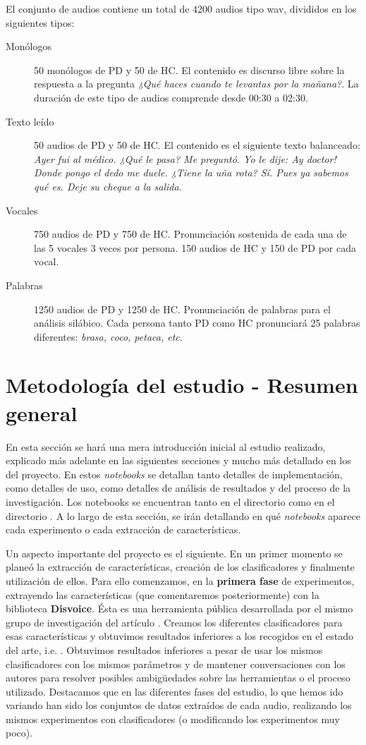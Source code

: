 El conjunto de audios contiene un total de 4200 audios tipo wav, divididos en los siguientes tipos:
\begin{description}
	\item[Monólogos] 50 monólogos de PD y 50 de HC. El contenido es discurso libre sobre la respuesta a la pregunta \textit{¿Qué haces cuando te levantas por la mañana?}. La duración de este tipo de audios comprende desde 00:30 a 02:30.
	\item[Texto leído] 50 audios de PD y 50 de HC. El contenido es el siguiente texto balanceado: \textit{Ayer fui al médico. ¿Qué le pasa? Me preguntó. Yo le dije: Ay doctor! Donde pongo el dedo me duele. ¿Tiene la uña rota? Sí. Pues ya sabemos qué es. Deje su cheque a la salida.}
	\item[Vocales] 750 audios de PD y 750 de HC. Pronunciación sostenida de cada una de las 5 vocales 3 veces por persona. 150 audios de HC y 150 de PD por cada vocal.
	\item[Palabras] 1250 audios de PD y 1250 de HC. Pronunciación de palabras para el análisis silábico. Cada persona tanto PD como HC pronunciará 25 palabras diferentes: \textit{brasa, coco, petaca, etc}.
\end{description}

\section{Metodología del estudio - Resumen general}
En esta sección se hará una mera introducción inicial al estudio realizado, explicado más adelante en las siguientes secciones y mucho más detallado en los  del proyecto. En estos \textit{notebooks} se detallan tanto detalles de implementación, como detalles de uso, como detalles de análisis de resultados y del proceso de la investigación. Los notebooks se encuentran tanto en el directorio  como en el directorio . A lo largo de esta sección, se irán detallando en qué \textit{notebooks} aparece cada experimento o cada extracción de características.

Un aspecto importante del proyecto es el siguiente. En un primer momento se planeó la extracción de características, creación de los clasificadores y finalmente utilización de ellos. Para ello comenzamos, en la \textbf{primera fase} de experimentos, extrayendo las características (que comentaremos posteriormente) con la biblioteca \textbf{Disvoice}. Ésta es una herramienta pública desarrollada por el mismo grupo de investigación del artículo \cite{Orz2016}. Creamos los diferentes clasificadores para esas características y obtuvimos resultados inferiores a los recogidos en el estado del arte, i.e. \cite{Orz2016}. Obtuvimos resultados inferiores a pesar de usar los mismos clasificadores con los mismos parámetros y de mantener conversaciones con los autores para resolver posibles ambigüedades sobre las herramientas o el proceso utilizado. Destacamos que en las diferentes fases del estudio, lo que hemos ido variando han sido los conjuntos de datos extraídos de cada audio, realizando los mismos experimentos con clasificadores (o modificando los experimentos muy poco).

